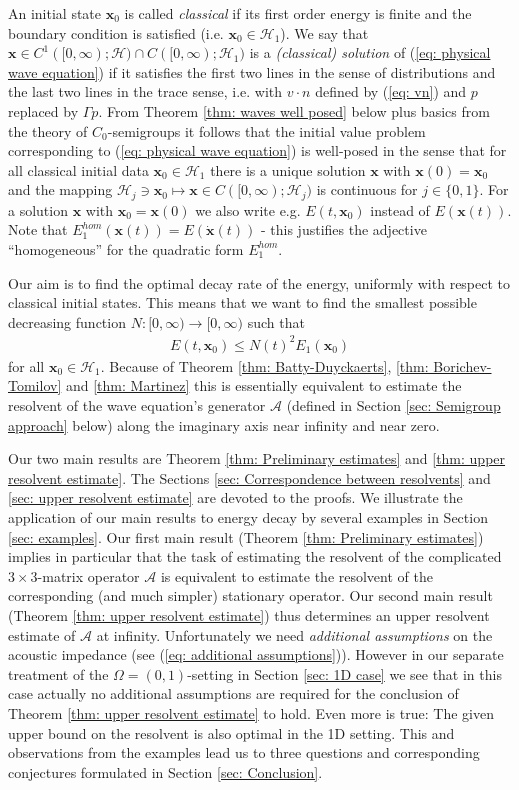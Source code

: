 \documentclass{amsart}
\newcommand{\A}{\mathcal{A}}
\newcommand{\xnice}{\mathbf{x}}
\newcommand{\Ho}{\mathcal{H}}
\begin{document}
An initial state $\xnice_0$ is called \emph{classical} if its first order energy is finite and the boundary condition is satisfied (i.e. $\xnice_0\in\Ho_1$). We say that $\xnice\in C^1([0,\infty); \Ho)\cap C([0,\infty);\Ho_1)$ is a \emph{(classical) solution} of (\ref{eq: physical wave equation}) if it satisfies the first two lines in the sense of distributions and the last two lines in the trace sense, i.e. with $v\cdot n$ defined by (\ref{eq: vn}) and $p$ replaced by $\Gamma p$. From Theorem \ref{thm: waves well posed} below plus basics from the theory of $C_0$-semigroups it follows that the initial value problem corresponding to (\ref{eq: physical wave equation}) is well-posed in the sense that for all classical initial data $\xnice_0\in\Ho_1$ there is a unique solution $\xnice$ with $\xnice(0)=\xnice_0$ and the mapping $\Ho_j\owns \xnice_0\mapsto \xnice\in C([0,\infty);\Ho_j)$ is continuous for $j\in\{0,1\}$. For a solution $\xnice$ with $\xnice_0=\xnice(0)$ we also write e.g. $E(t,\xnice_0)$ instead of $E(\xnice(t))$. Note that $E_1^{hom}(\xnice(t)) = E(\dot{\xnice}(t))$ - this justifies the adjective ``homogeneous'' for the quadratic form $E_1^{hom}$.

Our aim is to find the optimal decay rate of the energy, uniformly with respect to classical initial states. This means that we want to find the smallest possible decreasing function $N:[0,\infty)\rightarrow[0,\infty)$ such that
\begin{align*}
 E(t,\xnice_0) \leq N(t)^2 E_1(\xnice_0)
\end{align*}
for all $\xnice_0\in\Ho_1$. Because of Theorem \ref{thm: Batty-Duyckaerts}, \ref{thm: Borichev-Tomilov} and \ref{thm: Martinez} this is essentially equivalent to estimate the resolvent of the wave equation's generator $\A$ (defined in Section \ref{sec: Semigroup approach} below) along the imaginary axis near infinity and near zero. 

Our two main results are Theorem \ref{thm: Preliminary estimates} and \ref{thm: upper resolvent estimate}. The Sections \ref{sec: Correspondence between resolvents} and \ref{sec: upper resolvent estimate} are devoted to the proofs. We illustrate the application of our main results to energy decay by several examples in Section \ref{sec: examples}. Our first main result (Theorem \ref{thm: Preliminary estimates}) implies in particular that the task of estimating the resolvent of the complicated $3\times 3$-matrix operator $\A$ is equivalent to estimate the resolvent of the corresponding (and much simpler) stationary operator. Our second main result (Theorem \ref{thm: upper resolvent estimate}) thus determines an upper resolvent estimate of $\A$ at infinity. Unfortunately we need \emph{additional assumptions} on the acoustic impedance (see (\ref{eq: additional assumptions})). However in our separate treatment of the $\Omega=(0,1)$-setting in Section \ref{sec: 1D case} we see that in this case actually no additional assumptions are required for the conclusion of Theorem \ref{thm: upper resolvent estimate} to hold. Even more is true: The given upper bound on the resolvent is also optimal in the 1D setting. This and observations from the examples lead us to three questions and corresponding conjectures formulated in Section \ref{sec: Conclusion}.
\end{document}
